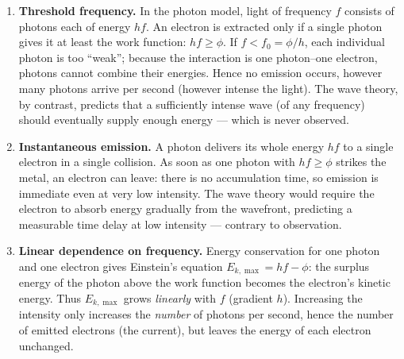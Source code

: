 \documentclass[11pt]{article}
\begin{document}
\begin{corrige}
\begin{enumerate}
\item \textbf{Threshold frequency.} In the photon model, light of frequency $f$ consists of photons each of energy $hf$. An electron is extracted only if a single photon gives it at least the work function: $hf \geq \phi$. If $f < f_0 = \phi/h$, each individual photon is too ``weak''; because the interaction is one photon–one electron, photons cannot combine their energies. Hence no emission occurs, however many photons arrive per second (however intense the light). The wave theory, by contrast, predicts that a sufficiently intense wave (of any frequency) should eventually supply enough energy — which is never observed.

\item \textbf{Instantaneous emission.} A photon delivers its whole energy $hf$ to a single electron in a single collision. As soon as one photon with $hf \geq \phi$ strikes the metal, an electron can leave: there is no accumulation time, so emission is immediate even at very low intensity. The wave theory would require the electron to absorb energy gradually from the wavefront, predicting a measurable time delay at low intensity — contrary to observation.

\item \textbf{Linear dependence on frequency.} Energy conservation for one photon and one electron gives Einstein's equation $E_{k,\max} = hf - \phi$: the surplus energy of the photon above the work function becomes the electron's kinetic energy. Thus $E_{k,\max}$ grows \emph{linearly} with $f$ (gradient $h$). Increasing the intensity only increases the \emph{number} of photons per second, hence the number of emitted electrons (the current), but leaves the energy of each electron unchanged.
\end{enumerate}
\end{corrige}
\end{document}
